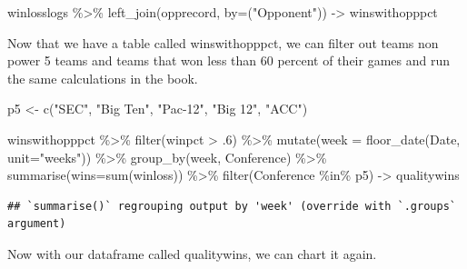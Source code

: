 \documentclass[
]{book}
\newenvironment{Shaded}{\begin{snugshade}}{\end{snugshade}}
\newcommand{\AttributeTok}[1]{\textcolor[rgb]{0.77,0.63,0.00}{#1}}
\newcommand{\DecValTok}[1]{\textcolor[rgb]{0.00,0.00,0.81}{#1}}
\newcommand{\FunctionTok}[1]{\textcolor[rgb]{0.00,0.00,0.00}{#1}}
\newcommand{\NormalTok}[1]{#1}
\newcommand{\OtherTok}[1]{\textcolor[rgb]{0.56,0.35,0.01}{#1}}
\newcommand{\SpecialCharTok}[1]{\textcolor[rgb]{0.00,0.00,0.00}{#1}}
\newcommand{\StringTok}[1]{\textcolor[rgb]{0.31,0.60,0.02}{#1}}
\begin{document}
\begin{Shaded}
\begin{Highlighting}[]
\NormalTok{winlosslogs }\SpecialCharTok{\%\textgreater{}\%} \FunctionTok{left\_join}\NormalTok{(opprecord, }\AttributeTok{by=}\NormalTok{(}\StringTok{"Opponent"}\NormalTok{)) }\OtherTok{{-}\textgreater{}}\NormalTok{ winswithopppct}
\end{Highlighting}
\end{Shaded}

Now that we have a table called winswithopppct, we can filter out teams non power 5 teams and teams that won less than 60 percent of their games and run the same calculations in the book.

\begin{Shaded}
\begin{Highlighting}[]
\NormalTok{p5 }\OtherTok{\textless{}{-}} \FunctionTok{c}\NormalTok{(}\StringTok{"SEC"}\NormalTok{, }\StringTok{"Big Ten"}\NormalTok{, }\StringTok{"Pac{-}12"}\NormalTok{, }\StringTok{"Big 12"}\NormalTok{, }\StringTok{"ACC"}\NormalTok{)}
\end{Highlighting}
\end{Shaded}

\begin{Shaded}
\begin{Highlighting}[]
\NormalTok{winswithopppct }\SpecialCharTok{\%\textgreater{}\%} \FunctionTok{filter}\NormalTok{(winpct }\SpecialCharTok{\textgreater{}}\NormalTok{ .}\DecValTok{6}\NormalTok{) }\SpecialCharTok{\%\textgreater{}\%} \FunctionTok{mutate}\NormalTok{(}\AttributeTok{week =} \FunctionTok{floor\_date}\NormalTok{(Date, }\AttributeTok{unit=}\StringTok{"weeks"}\NormalTok{)) }\SpecialCharTok{\%\textgreater{}\%} \FunctionTok{group\_by}\NormalTok{(week, Conference) }\SpecialCharTok{\%\textgreater{}\%} \FunctionTok{summarise}\NormalTok{(}\AttributeTok{wins=}\FunctionTok{sum}\NormalTok{(winloss)) }\SpecialCharTok{\%\textgreater{}\%} \FunctionTok{filter}\NormalTok{(Conference }\SpecialCharTok{\%in\%}\NormalTok{ p5) }\OtherTok{{-}\textgreater{}}\NormalTok{ qualitywins}
\end{Highlighting}
\end{Shaded}

\begin{verbatim}
## `summarise()` regrouping output by 'week' (override with `.groups` argument)
\end{verbatim}

Now with our dataframe called qualitywins, we can chart it again.
\end{document}
